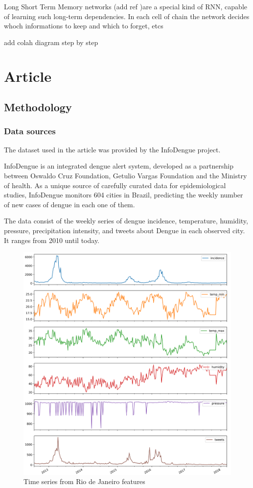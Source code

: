 \documentclass[12pt]{report}
\begin{document}
Long Short Term Memory networks (add ref )are a special kind of RNN, capable of learning
such long-term dependencies. In each cell of chain the network decides whoch informations to keep
and which to forget, etcs

add colah diagram step by step

\newpage
\chapter{Article}

\section{Methodology}


\subsection{Data sources}
The dataset used in the article was provided by the InfoDengue project. 

InfoDengue \citep{Codeco046193} is an integrated dengue alert system, developed as a partnership between Oswaldo Cruz Foundation, Getulio Vargas Foundation and the Ministry of health. As a unique source of carefully curated data for epidemiological studies, InfoDengue monitors 604 cities in Brazil, predicting the weekly number of new cases of dengue in each one of them.

The data consist of the weekly series of dengue incidence,  temperature, humidity, pressure, precipitation intensity, and tweets about Dengue in each observed city. It ranges from 2010 until today.

\begin{figure}[h!]
 \centering
 \includegraphics[width=\textwidth]{rio_raw_series.png}
 \caption{Time series from Rio de Janeiro features}
 \label{fig: rio_raw}
\end{figure}
\end{document}
